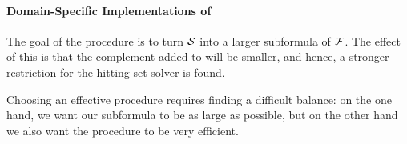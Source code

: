 \paragraph{Domain-Specific Implementations of \grow} \label{para:domainspecificgrow}

The goal of the \grow procedure is to turn $\mathcal{S}$ into a larger subformula of $\mathcal{F} $. The effect of this is that the complement added to \setstohit will be smaller, and hence, a stronger restriction for the hitting set solver is found.  

Choosing an effective \grow procedure requires finding a difficult balance: on the one hand, we want our subformula to be as large as possible, %
but on the other hand we also want the procedure to be very efficient. 

